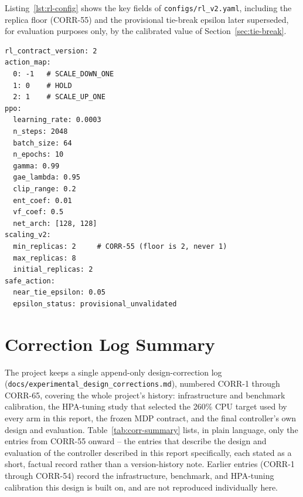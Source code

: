 Listing~\ref{lst:rl-config} shows the key fields of
\texttt{configs/\allowbreak \allowbreak rl\_\allowbreak v2.yaml}, including the replica floor (CORR-55) and
the provisional tie-break epsilon later superseded, for evaluation
purposes only, by the calibrated value of Section~\ref{sec:tie-break}.

\begin{lstlisting}[caption={Key fields of \texttt{configs/\allowbreak \allowbreak rl\_\allowbreak v2.yaml}.},label={lst:rl-config}]
rl_contract_version: 2
action_map:
  0: -1   # SCALE_DOWN_ONE
  1: 0    # HOLD
  2: 1    # SCALE_UP_ONE
ppo:
  learning_rate: 0.0003
  n_steps: 2048
  batch_size: 64
  n_epochs: 10
  gamma: 0.99
  gae_lambda: 0.95
  clip_range: 0.2
  ent_coef: 0.01
  vf_coef: 0.5
  net_arch: [128, 128]
scaling_v2:
  min_replicas: 2     # CORR-55 (floor is 2, never 1)
  max_replicas: 8
  initial_replicas: 2
safe_action:
  near_tie_epsilon: 0.05
  epsilon_status: provisional_unvalidated
\end{lstlisting}

\section{Correction Log Summary}

The project keeps a single append-only design-correction log
(\texttt{docs/\allowbreak \allowbreak experimental\_\allowbreak design\_\allowbreak corrections.md}), numbered CORR-1
through CORR-65, covering the whole project's history: infrastructure and
benchmark calibration, the HPA-tuning study that selected the 260\% CPU
target used by every arm in this report, the frozen MDP contract, and the
final controller's own design and evaluation. Table~\ref{tab:corr-summary}
lists, in plain language, only the entries from CORR-55 onward -- the
entries that describe the design and evaluation of the controller
described in this report specifically, each stated as a short, factual
record rather than a version-history note. Earlier entries (CORR-1 through
CORR-54) record the infrastructure, benchmark, and HPA-tuning calibration
this design is built on, and are not reproduced individually here.

